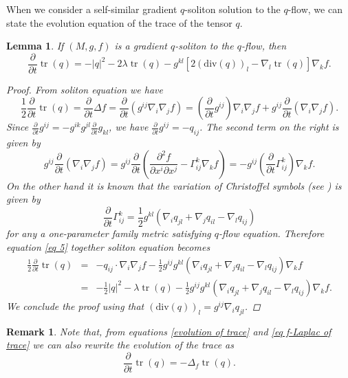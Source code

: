 \documentclass{amsart}
\theoremstyle{plain}
\newtheorem{lemma}[theorem]{\bf Lemma}
\newtheorem{remark}[theorem]{Remark}
\numberwithin{equation}{section}
\begin{document}
When we consider a self-similar gradient $q$-soliton solution to the $q$-flow,  we can state the evolution equation of the trace of the tensor $q$.
\begin{lemma}\label{evolution trace}
  If $(M,g,f)$  is a gradient $q$-soliton to the $q$-flow, then 
\begin{equation}\label{evolution of trace}
\frac{\partial}{\partial t}\operatorname{tr}(q)=-|q|^2-2\lambda\operatorname{tr}(q)-g^{kl}\left[2(\mathrm{div}(q))_l-\nabla_l\operatorname{tr}(q)\right]\nabla_kf.
\end{equation}
\begin{proof}
From soliton equation we have
\begin{equation}\label{eq 5}
\frac{1}{2}\frac{\partial}{\partial t}\operatorname{tr}(q)=\frac{\partial}{\partial t}\Delta f=\frac{\partial}{\partial t}(g^{ij}\nabla_i\nabla_jf)=(\frac{\partial}{\partial t}g^{ij})\nabla_i\nabla_jf+g^{ij}\frac{\partial}{\partial t}(\nabla_i\nabla_jf).
\end{equation}
Since $\frac{\partial}{\partial t}g^{ij}=-g^{ik}g^{jl}\frac{\partial}{\partial t}g_{kl}$, we have $\frac{\partial}{\partial t}g^{ij}=-q_{ij}$. The second term on the right is given by
$$g^{ij}\frac{\partial}{\partial t}(\nabla_i\nabla_jf)=g^{ij}\frac{\partial}{\partial t}\left(\frac{\partial^2f}{\partial x^i\partial x^j}-\Gamma_{ij}^k\nabla_kf\right)=-g^{ij}\left(\frac{\partial}{\partial t}\Gamma_{ij}^k\right)\nabla_kf.$$
 On the other hand it is known that the variation of Christoffel symbols (see \cite{B Chow}) is given by
$$\frac{\partial}{\partial t}\Gamma_{ij}^k=\frac{1}{2}g^{kl}\left(\nabla_iq_{jl}+\nabla_jq_{il}-\nabla_lq_{ij}\right)$$
    for any a one-parameter
family metric satisfying $q$-flow equation. Therefore equation \eqref{eq 5} together soliton equation becomes
\begin{eqnarray*}
   \frac{1}{2}\frac{\partial}{\partial t}\operatorname{tr}(q) &=&-q_{ij}\cdot\nabla_i\nabla_jf-\frac{1}{2}g^{ij}g^{kl}\left(\nabla_iq_{jl}+\nabla_jq_{il}-\nabla_lq_{ij}\right)\nabla_kf\\
   &=& -\frac{1}{2}|q|^2-\lambda \operatorname{tr}(q)-\frac{1}{2}g^{ij}g^{kl}\left(\nabla_iq_{jl}+\nabla_jq_{il}-\nabla_lq_{ij}\right)\nabla_kf.
\end{eqnarray*}
We conclude the proof using that $(\mathrm{div}(q))_l=g^{ij}\nabla_iq_{jl}$.
\end{proof}
\end{lemma}

\begin{remark} Note that, from equations \eqref{evolution of trace} and \eqref{eq f-Laplac of trace} we can also  rewrite the evolution of the trace as
\begin{equation}
    \frac{\partial}{\partial t}\operatorname{tr}(q)=-\Delta_f\operatorname{tr}(q).
\end{equation}
\end{remark}
\end{document}
